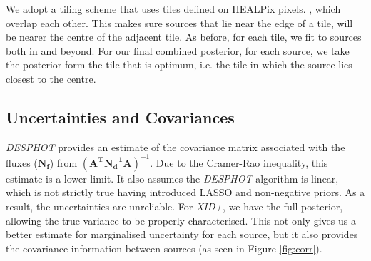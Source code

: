 \documentclass[useAMS,usenatbib]{mnras}
\begin{document}
%
%

We adopt a tiling scheme that uses tiles defined on HEALPix \citep{Gorski:2005} pixels. , which overlap each other. This makes sure sources that lie near the edge of a tile, will be nearer the centre of the adjacent tile. As before, for each tile, we fit to sources both in and beyond. For our final combined posterior, for each source, we take the posterior form the tile that is optimum, i.e. the tile in which the source lies closest to the centre.

\subsection{Uncertainties and Covariances}
\emph{DESPHOT} provides an estimate of the covariance matrix associated with the fluxes ($\mathbf{N_f}$) from $(\mathbf{A^TN_d^{-1}A})^{-1}$. Due to the Cramer-Rao inequality, this estimate is a lower limit. It also assumes the \emph{DESPHOT} algorithm is linear, which is not strictly true having introduced LASSO and non-negative priors. As a result, the uncertainties are unreliable. For \emph{XID+}, we have the full posterior, allowing the true variance to be properly characterised. This not only gives us a better estimate for marginalised uncertainty for each source, but it also provides the covariance information between sources (as seen in Figure \ref{fig:corr}). 
%
\end{document}
